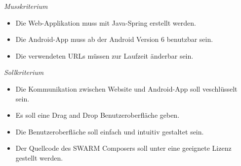 \textit{Musskriterium}

\begin{itemize}[leftmargin=4pc]
	\item Die Web-Applikation muss mit Java-Spring erstellt werden.
	\item Die Android-App muss ab der Android Version 6 benutzbar sein.
	\item Die verwendeten URLs müssen zur Laufzeit änderbar sein.
\end{itemize}

\textit{Sollkriterium}

\begin{itemize}[leftmargin=4pc]
	\item Die Kommunikation zwischen Website und Android-App soll veschlüsselt sein.
	\item Es soll eine Drag and Drop Benutzeroberfläche geben.
	\item Die Benutzeroberfläche soll einfach und intuitiv gestaltet sein.
	\item Der Quellcode des SWARM Composers soll unter eine geeignete Lizenz gestellt werden.
\end{itemize}